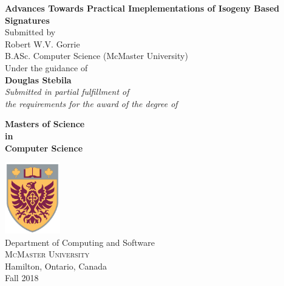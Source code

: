 \begin{titlepage}

\begin{center}
\Large \textbf {Advances Towards Practical Imeplementations of Isogeny Based Signatures}\\[1in]

\normalsize Submitted by \\[0.25in]

Robert W.V. Gorrie \\
B.ASc. Computer Science (McMaster University)\\

\vspace{.6in}
Under the guidance of\\
{\textbf{Douglas Stebila}}\\[0.6in]

\small \emph{Submitted in partial fulfillment of\\
        the requirements for the award of the degree of}
        \vspace{.2in}

       {\bf Masters of Science \\in\\ Computer Science}\\[0.5in]

\vfill

\includegraphics[width=0.18\textwidth]{cresticon}\\[0.1in]
\Large{Department of Computing and Software}\\
\normalsize
\textsc{McMaster University}\\
Hamilton, Ontario, Canada\\
\vspace{0.2cm}
Fall 2018

\end{center}

\end{titlepage}
